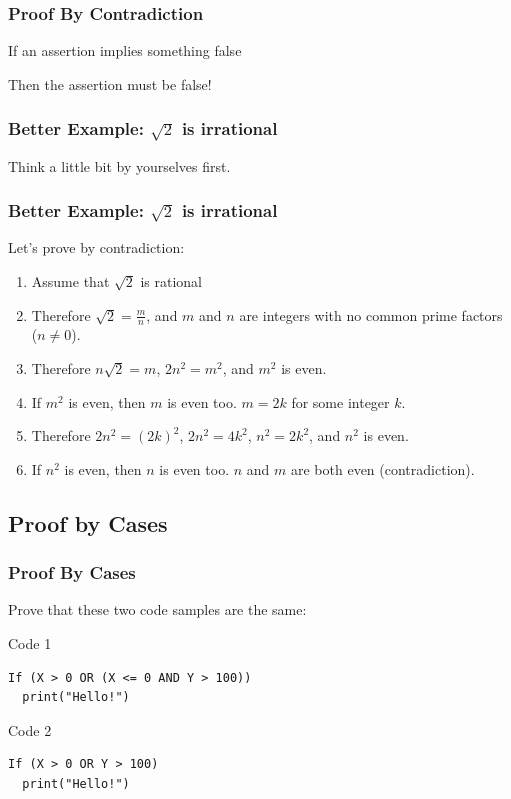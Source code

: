\documentclass{beamer}
\begin{document}
\begin{frame}
  \frametitle{Proof By Contradiction}

  If an assertion \alert{implies something false}

  \bigskip

  Then the \alert{assertion must be false!}
\end{frame}

\begin{frame}
  \frametitle{Better Example: $\sqrt{2}$ is irrational}

  \begin{center}
    Think a little bit by yourselves first.
  \end{center}
\end{frame}

\begin{frame}
  \frametitle{Better Example: $\sqrt{2}$ is irrational}

  Let's prove by contradiction:

  \bigskip

  \begin{enumerate}
  \item Assume that $\sqrt{2}$ is rational
    \bigskip
  \item Therefore $\sqrt{2} = \frac{m}{n}$, and $m$ and $n$ are
    integers with \alert{no common prime factors} ($n\neq0$).
    \bigskip
  \item Therefore $n\sqrt{2} = m$, $2n^2 = m^2$, and $m^2$ is even.
    \bigskip
  \item If $m^2$ is even, then $m$ is even too. $m = 2k$ for some integer $k$.
    \bigskip
  \item Therefore $2n^2 = (2k)^2$, $2n^2 = 4k^2$, $n^2 = 2k^2$, and $n^2$ is even.
    \bigskip
  \item If $n^2$ is even, then $n$ is even too. \alert{$n$ and $m$ are both even (contradiction).}
  \end{enumerate}



\end{frame}

\subsection{Proof by Cases}

\begin{frame}[fragile]
  \frametitle{Proof By Cases}

  Prove that these two code samples are the same:

  \vfill

  \begin{block}{Code 1}
\begin{verbatim}
If (X > 0 OR (X <= 0 AND Y > 100))
  print("Hello!")
\end{verbatim}
  \end{block}
  \begin{block}{Code 2}
\begin{verbatim}
If (X > 0 OR Y > 100)
  print("Hello!")
\end{verbatim}
  \end{block}

\end{frame}
\end{document}
